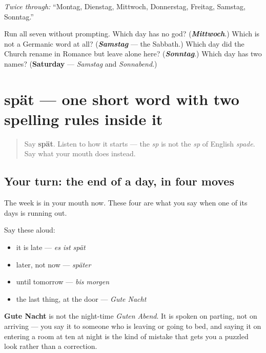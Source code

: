 \emph{Twice through:} \textquotedblleft{}Montag, Dienstag, Mittwoch, Donnerstag, Freitag, Samstag, Sonntag.\textquotedblright{}

\begin{tcolorbox}[breakable,colback=teal!4,colframe=teal!35!black,title={Before you move on}]
Run all seven without prompting. Which day has no god? (\emph{\textbf{Mittwoch}}.) Which is not a Germanic word at all? (\emph{\textbf{Samstag}} — the Sabbath.) Which day did the Church rename in Romance but leave alone here? (\emph{\textbf{Sonntag}}.) Which day has two names? (\textbf{Saturday} — \emph{Samstag} and \emph{Sonnabend}.)
\end{tcolorbox}
\section[Practice]{spät — one short word with two spelling rules inside it}

\label{lesson:GE-R07-spaet-und-was-drin-steckt}



\begin{quote}
Say \textbf{spät}. Listen to how it starts — the \emph{sp} is not the \emph{sp} of English \emph{spade}. Say what your mouth does instead.
\end{quote}

\subsection*{Your turn: the end of a day, in four moves}
The week is in your mouth now. These four are what you say when one of its days is running out.

Say these aloud:

\begin{itemize}
\raggedright
  \item it is late — \emph{es ist spät}
  \item later, not now — \emph{später}
  \item until tomorrow — \emph{bis morgen}
  \item the last thing, at the door — \emph{Gute Nacht}
\end{itemize}

\textbf{Gute Nacht} is not the night-time \emph{Guten Abend}. It is spoken on parting, not on arriving — you say it to someone who is leaving or going to bed, and saying it on entering a room at ten at night is the kind of mistake that gets you a puzzled look rather than a correction.

